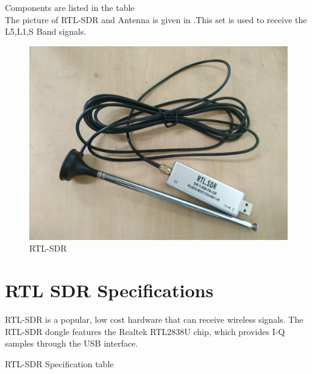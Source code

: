 Components are listed in the table \\
The picture of RTL-SDR and Antenna is given in .This set is used to receive the L5,L1,S Band  signals.
\begin{figure}[H]
\centering
\includegraphics[width=0.5\columnwidth]{figs/rtl-sdr.png}
\caption{RTL-SDR}
\label{fig:rtl-sdr}
\end{figure}
\section{RTL SDR Specifications}
RTL-SDR is a popular, low cost hardware that can receive wireless signals. The RTL-SDR dongle features the Realtek RTL2838U chip, which provides I-Q samples through the USB interface. 
\begin{table}[!ht]
  \centering
 
  \caption{RTL-SDR Specification table }
  \label{tab:rxcomponents}
\end{table}

